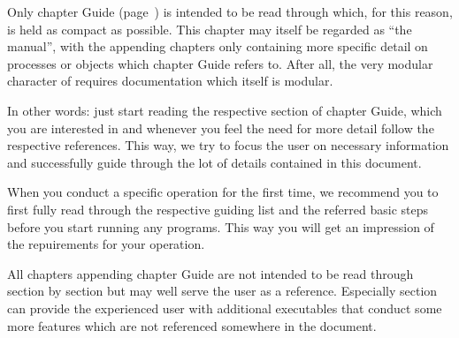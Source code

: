 
%
%
%
Only chapter Guide (page~\pageref{guide}) is intended to be read through which, for this reason, is held as compact 
as possible. This chapter may itself be regarded as ``the manual'', with the appending chapters only 
containing more specific detail on processes or objects which chapter Guide refers to.
After all, the very modular character of \ASKI{} requires documentation which itself is modular.

In other words: just start reading the respective section of chapter Guide, which you are interested in 
and whenever you feel the need for more detail follow the respective references. This way, we try to focus
the user on necessary information and successfully guide through the lot of details contained in this document. 

When you conduct a specific \ASKI{} operation for the first time, we recommend you to first fully read through the 
respective guiding list and the referred basic steps before you start running any programs. This way you will 
get an impression of the repuirements for your operation.

All chapters appending chapter Guide are not intended to be read through section by section but may well
serve the user as a reference. Especially section~ can provide the 
experienced user with additional executables that conduct some more features which are not referenced somewhere
in the document.

\vspace{1cm}



